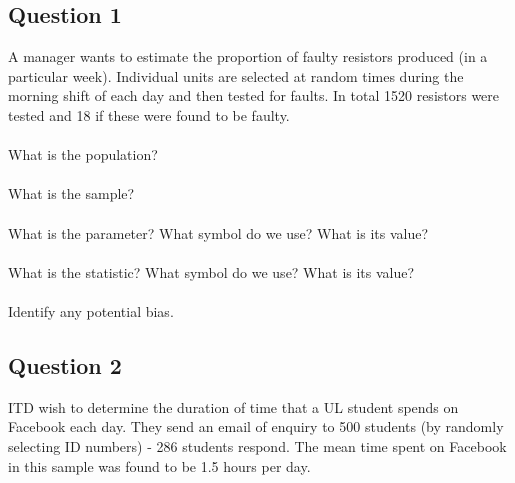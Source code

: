 \documentclass[12pt]{article}
\begin{document}
\subsection*{Question 1}

A manager wants to estimate the proportion of faulty resistors produced (in a particular week). Individual units are selected at random times during the morning shift of each day and then tested for faults. In total 1520 resistors were tested and 18 if these were found to be faulty.\\

\hspace{-1.8cm}{\bf a.}\vspace{-0.5cm}\\
What is the population?\\[-0.3cm]

\hspace{-1.8cm}{\bf b.}\vspace{-0.5cm}\\
What is the sample?\\[-0.3cm]

\hspace{-1.8cm}{\bf c.}\vspace{-0.5cm}\\
What is the parameter? What symbol do we use? What is its value?\\[-0.3cm]

\hspace{-1.8cm}{\bf d.}\vspace{-0.5cm}\\
What is the statistic? What symbol do we use? What is its value?\\[-0.3cm]

\hspace{-1.8cm}{\bf e.}\vspace{-0.5cm}\\
Identify any potential bias.\\[-0.3cm]


\subsection*{Question 2}
ITD wish to determine the duration of time that a UL student spends on Facebook each day. They send an email of enquiry to 500 students (by randomly selecting ID numbers) - 286 students respond. The mean time spent on Facebook in this sample was found to be 1.5 hours per day.\\
\end{document}
